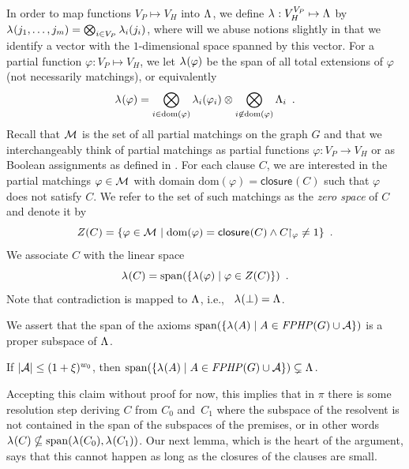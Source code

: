 \documentclass{article}
\newcommand{\funcdescr}[3]{\ensuremath{ #1 : #2 \to #3}}
\newcommand{\set}[1]{\{ #1 \}}
\newcommand{\setdescr}[3][\mid]{\set{ #2 #1 #3 }}
\newcommand{\setsize}[1]{\lvert#1\rvert}
\newcommand{\introduceterm}[1]{{\emph{#1}}}
\newcommand{\eqperiod}{\enspace .}
\newcommand{\ie}{i.e.,\ }
\newcommand{\refpi}{\pi}
\newcommand{\clc}{\ensuremath{C}}
\newcommand{\restrict}[2]{{{#1}\!\!\upharpoonright_{#2}}}
\newcommand{\formulaformat}[1]{\mathit{#1}}
\newcommand{\graphfphpnot}[1][G]{\formulaformat{FPHP}({#1})}
\newcommand{\GFPHP}{G\text{-}FPHP}
\renewcommand{\GFPHP}{\graphfphpnot[G]}
\newcommand{\diff}{\xi}
\newcommand{\V}[1][]{V_{#1}}
\newcommand{\Vp}{\V[P]}
\newcommand{\Vh}{\V[H]}
\newcommand{\Ax}{\ensuremath\mathcal{A}}
\newcommand{\linspace}[1][]{\ensuremath \Lambda_{{#1}}}
\newcommand{\linmap}[1][]{\ensuremath \lambda_{{#1}}}
\newcommand{\linmapof}[2][]{\linmap[#1](#2)}
\newcommand{\closure}[2][]{\mathsf{closure}_{{#1}}(#2)}
\newcommand{\matcha}{\varphi}
\newcommand{\matchings}[1][]{\ensuremath \mathcal{M}_{{#1}}}
\newcommand{\Null}[1]{\ensuremath Z(#1)}
\newcommand{\spans}[1]{\mathrm{span} ( #1 )}
\newcommand{\dom}[1]{\mathrm{dom} ( #1 )}
\newcommand{\tensor}{\ensuremath \otimes}
\newcommand{\bigtensor}{\ensuremath \bigotimes}
\numberwithin{equation}{section}
\begin{document}
In order to map functions $\Vp \mapsto \Vh$ into $\linspace$, we define $\linmap : \Vh^{\Vp} \mapsto \linspace$ by 
$\linmapof{ j_1, \ldots, j_m} = \bigtensor_{i\in \Vp}
\linmapof[i]{j_i}$,
where will we abuse notions slightly in that we identify a vector with the
$1$\nobreakdash-di\-men\-sion\-al space spanned by this vector.
For a partial function $\matcha : \Vp \mapsto \Vh$, 
we
let $\linmapof{\matcha}$ 
be the span of all total extensions of $\matcha$ (not necessarily matchings), 
or equivalently
\begin{equation}
  \label{eq:lanbda-map-def}
  \linmapof{\matcha} = \bigtensor_{i \in \dom{\matcha}} 
  \linmapof[i]{\matcha_i} \tensor 
  \bigtensor_{ i \not \in \dom{\matcha}}\linspace[i] \eqperiod
\end{equation}
Recall that $\matchings$ is the set of all partial matchings on the
graph $G$ and that we interchangeably think of partial matchings as
partial functions $\funcdescr{\matcha}{\Vp}{\Vh}$ or as Boolean
assignments as defined in .
For each clause $C$, we are interested in the partial matchings
$\matcha \in \matchings$ with domain $ \dom{\matcha} = \closure{C} $
such that $\matcha$ does not satisfy $C$.  We refer to the set of such
matchings as the \introduceterm{zero space} of $\clc$ and denote it by
\begin{equation}\label{eq:def_null}
  \Null{C}
   = \set{\matcha \in \matchings \mid \dom{\matcha} = \closure{C} \wedge
     \restrict{C}{\matcha} \neq 1}
   \eqperiod
\end{equation}
We associate $C$ with the linear space
\begin{equation}
  \linmapof{C} = 
  \spans{ \setdescr{\linmapof{\matcha} }{ \matcha \in \Null{C}}} \eqperiod  
\end{equation}
Note that contradiction is mapped to $\linspace$, \ie
$\linmapof{\bot} = \linspace$. 

We assert that the span of the axioms
$\spans{\setdescr{\linmapof{A}}{A \in \GFPHP \cup \Ax}}$ 
is a proper subspace of $\linspace$.

\begin{lemma} \label{clm:fphp_spanL} \label{lem:fphp_spanL}
  If $\setsize{\Ax} \le (1 + \diff)^{w_0}$, then 
  $\spans{\setdescr{\linmapof{A}}{A \in \GFPHP \cup \Ax}} \subsetneq \linspace$.
\end{lemma}

Accepting this claim without proof for now, this implies that in
$\refpi$ there is some resolution step deriving $C$ from $C_0$
and~$C_1$ where the subspace of the resolvent is not contained in the
span of the subspaces of the premises, or in other words
$ \linmapof{C}
\nsubseteq 
\spans{\linmapof{C_0}, \linmapof{C_1}}
$.
Our next lemma, which is the heart of the argument,
says that this cannot happen 
as long as the closures of the clauses are small. 
\end{document}
